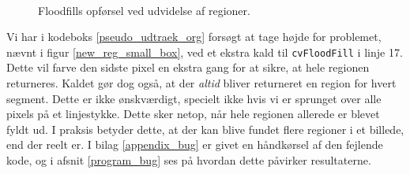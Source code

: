 {\begin{figure}[p]
    \setlength\fboxsep{0pt}
    \setlength\fboxrule{0.5pt}
    \centering
    \\
    \caption[]{
    Floodfills opførsel ved udvidelse af regioner.
    }
    \label{floodfill_return_entire_region}
\end{figure}

Vi har i kodeboks \ref{pseudo_udtraek_org} forsøgt at tage højde for
problemet, nævnt i figur \ref{new_reg_small_box}, ved et ekstra kald til
\texttt{cvFloodFill} i linje 17. Dette vil farve den sidste pixel en
ekstra gang for at sikre, at hele regionen returneres. Kaldet gør dog
også, at der \emph{altid} bliver returneret en region for hvert segment.
Dette er ikke ønskværdigt, specielt ikke hvis vi er sprunget over alle
pixels på et linjestykke. Dette sker netop, når hele regionen allerede
er blevet fyldt ud. I praksis betyder dette, at der kan blive fundet
flere regioner i et billede, end der reelt er. I bilag \ref{appendix_bug}
er givet en håndkørsel af den fejlende kode, og i afsnit
\ref{program_bug} ses på hvordan dette påvirker resultaterne.

}
